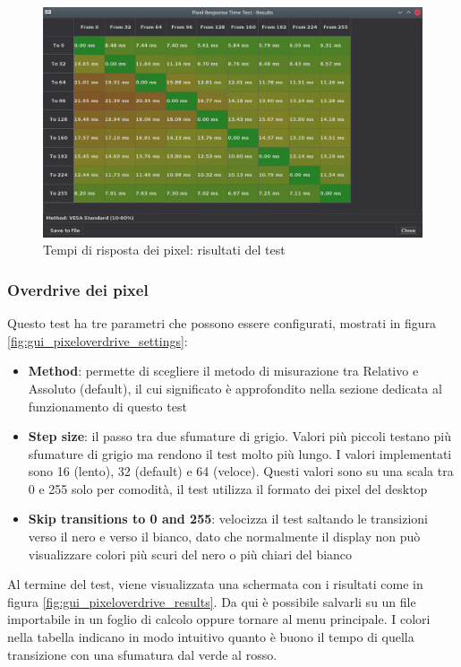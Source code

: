 \begin{figure}[H]
	\centering
	\includegraphics[width=\textwidth]{Applicazione_files/gui_pixelresponse_results.png}
	\caption{Tempi di risposta dei pixel: risultati del test}
	\label{fig:gui_pixelresponse_results}
\end{figure}

\subsubsection{Overdrive dei pixel}
Questo test ha tre parametri che possono essere configurati, mostrati in figura \ref{fig:gui_pixeloverdrive_settings}:\begin{itemize}
	\item \textbf{Method}: permette di scegliere il metodo di misurazione tra Relativo e Assoluto (default), il cui significato è approfondito nella sezione dedicata al funzionamento di questo test
	\item \textbf{Step size}: il passo tra due sfumature di grigio. Valori più piccoli testano più sfumature di grigio ma rendono il test molto più lungo. I valori implementati sono 16 (lento), 32 (default) e 64 (veloce). Questi valori sono su una scala tra 0 e 255 solo per comodità, il test utilizza il formato dei pixel del desktop
	\item \textbf{Skip transitions to 0 and 255}: velocizza il test saltando le transizioni verso il nero e verso il bianco, dato che normalmente il display non può visualizzare colori più scuri del nero o più chiari del bianco
\end{itemize}

Al termine del test, viene visualizzata una schermata con i risultati come in figura \ref{fig:gui_pixeloverdrive_results}. Da qui è possibile salvarli su un file importabile in un foglio di calcolo oppure tornare al menu principale. I colori nella tabella indicano in modo intuitivo quanto è buono il tempo di quella transizione con una sfumatura dal verde al rosso.


